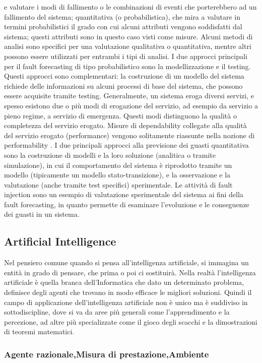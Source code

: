 \documentclass[14pt]{extarticle}
\begin{document}
e valutare i modi di fallimento o le combinazioni di eventi che porterebbero ad
un fallimento del sistema; quantitativa (o probabilistica), che mira a valutare
in termini probabilistici il grado con cui alcuni attributi vengono soddisfatti
dal sistema; questi attributi sono in questo caso visti come misure. Alcuni
metodi di analisi sono specifici per una valutazione qualitativa o quantitativa, mentre altri possono essere utilizzati per entrambi i tipi di analisi. I due approcci principali per il fault forecasting di tipo probabilistico sono la modellizzazione e il testing. Questi approcci sono complementari: la costruzione di
un modello del sistema richiede delle informazioni su alcuni processi di base
del sistema, che possono essere acquisite tramite testing. Generalmente, un
sistema eroga diversi servizi, e spesso esistono due o più modi di erogazione
del servizio, ad esempio da servizio a pieno regime, a servizio di emergenza.
Questi modi distinguono la qualità o completezza del servizio erogato. Misure di dependability collegate alla qualità del servizio erogato (performance)
vengono solitamente riassunte nella nozione di performability \cite{smith1988performability}.
I due principali approcci alla previsione dei guasti quantitativa sono la
costruzione di modelli e la loro soluzione (analitica o tramite simulazione), in
cui il comportamento del sistema è riprodotto tramite un modello (tipicamente
un modello stato-transizione), e la osservazione e la valutazione (anche tramite
test specifici) sperimentale. Le attività di fault injection sono un esempio di
valutazione sperimentale del sistema ai fini della fault forecasting, in quanto
permette di esaminare l'evoluzione e le conseguenze dei guasti in un sistema.


\subsection{Artificial Intelligence}
Nel pensiero comune quando si pensa all'intelligenza artificiale, si immagina un entità in grado di pensare, che prima o poi ci sostituirà. Nella realtà l'intelligenza artificiale è quella branca dell'Informatica che dato un determinato problema, definisce degli agenti che trovano in modo efficace le migliori soluzioni. Quindi il campo di  applicazione dell'intelligenza artificiale non è unico ma è suddiviso in sottodiscipline, dove si va da aree più generali come l'apprendimento e la percezione, ad altre più specializzate come il gioco degli scacchi e la dimostrazioni di teoremi matematici.
\subsubsection{Agente razionale,Misura di prestazione,Ambiente}
\end{document}
